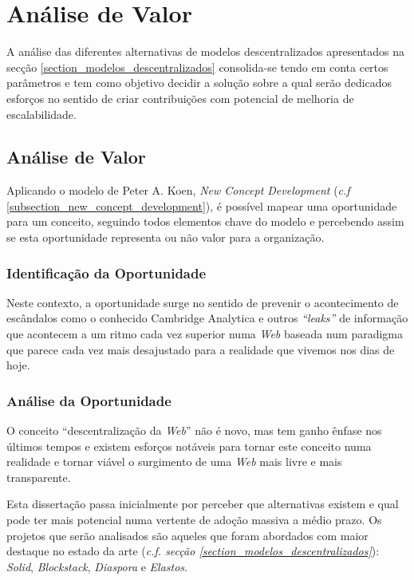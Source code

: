 \chapter{Análise de Valor}
\label{cap:3}

A análise das diferentes alternativas de modelos descentralizados apresentados na secção \ref{section_modelos_descentralizados} consolida-se tendo em conta certos parâmetros e tem como objetivo decidir a solução sobre a qual serão dedicados esforços no sentido de criar contribuições com potencial de melhoria de escalabilidade.

\section{Análise de Valor\label{section_analise}}

Aplicando o modelo de Peter A. Koen, \emph{New Concept Development} (\emph{c.f} \ref{subsection_new_concept_development}), é possível mapear uma oportunidade para um conceito, seguindo todos elementos chave do modelo e percebendo assim
se esta oportunidade representa ou não valor para a organização.

\subsection{Identificação da Oportunidade}
Neste contexto, a oportunidade surge no sentido de prevenir o acontecimento de escândalos como o conhecido Cambridge Analytica e outros \emph{“leaks”} \cite{cambridge_analytica} de informação que acontecem a um ritmo cada vez superior numa \emph{Web} baseada num paradigma que parece cada vez mais desajustado para a realidade que vivemos nos dias de hoje.

\subsection{Análise da Oportunidade}
O conceito “descentralização da \emph{Web}” não é novo, mas tem ganho ênfase nos últimos tempos e existem esforços notáveis para tornar este conceito numa realidade e tornar viável o surgimento de uma \emph{Web} mais livre e mais transparente.

Esta dissertação passa inicialmente por perceber que alternativas existem e qual pode ter mais potencial numa vertente de adoção massiva a médio prazo. Os projetos que serão analisados são aqueles que foram abordados com maior destaque no estado da arte (\emph{c.f. secção \ref{section_modelos_descentralizados}}): \emph{Solid}, \emph{Blockstack}, \emph{Diaspora} e \emph{Elastos}.

